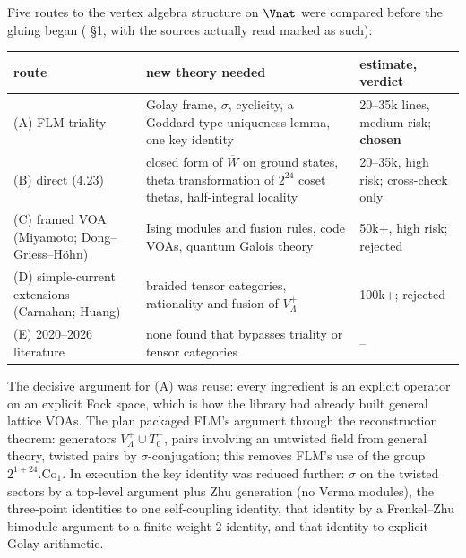 Five routes to the vertex algebra structure on $\Vnat$ were compared before the gluing began
( \S1, with the sources actually read marked as such):
\begin{center}
\begin{tabular}{p{3.6cm}p{6.0cm}p{3.6cm}}
\toprule
route & new theory needed & estimate, verdict\\
\midrule
(A) FLM triality & Golay frame, $\sigma$, cyclicity, a Goddard-type uniqueness lemma, one key identity & 20--35k lines, medium risk; \textbf{chosen}\\
(B) direct (4.23) & closed form of $\overline W$ on ground states, theta transformation of $2^{24}$ coset thetas, half-integral locality & 20--35k, high risk; cross-check only\\
(C) framed VOA (Miyamoto; Dong--Griess--H\"ohn) & Ising modules and fusion rules, code VOAs, quantum Galois theory & 50k+, high risk; rejected\\
(D) simple-current extensions (Carnahan; Huang) & braided tensor categories, rationality and fusion of $V_\Lambda^+$ & 100k+; rejected\\
(E) 2020--2026 literature & none found that bypasses triality or tensor categories & --\\
\bottomrule
\end{tabular}
\end{center}
The decisive argument for (A) was reuse: every ingredient is an explicit operator on an explicit Fock
space, which is how the library had already built general lattice VOAs. The plan packaged FLM's
argument through the reconstruction theorem: generators $V_\Lambda^+\cup T_0^+$, pairs involving an
untwisted field from general theory, twisted pairs by $\sigma$-conjugation; this removes FLM's use
of the group $2^{1+24}.\mathrm{Co}_1$. In execution the key identity was reduced further: $\sigma$ on
the twisted sectors by a top-level argument plus Zhu generation (no Verma modules), the three-point
identities to one self-coupling identity, that identity by a Frenkel--Zhu bimodule argument to a
finite weight-2 identity, and that identity to explicit Golay arithmetic.

